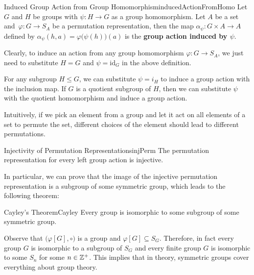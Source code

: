 \documentclass[math]{amznotes}
\theoremstyle{remark}
\newcommand{\0}{\mathbf{0}}
\newcommand{\1}{\mathbf{1}}
\begin{document}
\begin{dfnbox}{Induced Group Action from Group Homomorphism}{inducedActionFromHomo}
    Let $G$ and $H$ be groups with $\psi \colon H \to G$ as a group homomorphism. Let $A$ be a set and~$\varphi \colon G \to S_A$ be a permutation representation, then the map $\alpha_{\psi} \colon G \times A \to A$ defined by $\alpha_{\psi}\left(h, a\right) = \varphi\bigl(\psi\left(h\right)\bigr)\left(a\right)$ is the {\color{red} \textbf{group action induced by $\psi$}}.
\end{dfnbox}
Clearly, to induce an action from any group homomorphism $\varphi \colon G \to S_A$, we just need to substitute $H = G$ and $\psi = \mathrm{id}_G$ in the above definition.

For any subgroup $H \leq G$, we can substitute $\psi = i_H$ to induce a group action with the inclusion map. If $G$ is a quotient subgroup of $H$, then we can substitute $\psi$ with the quotient homomorphism and induce a group action.

Intuitively, if we pick an element from a group and let it act on all elements of a set to permute the set, different choices of the element should lead to different permutations.
\begin{probox}{Injectivity of Permutation Representations}{injPerm}
    The permutation representation for every left group action is injective.
\end{probox}
In particular, we can prove that the image of the injective permutation representation is a subgroup of some symmetric group, which leads to the following theorem:
\begin{thmbox}{Cayley's Theorem}{Cayley}
    Every group is isomorphic to some subgroup of some symmetric group.
\end{thmbox}
Observe that $\bigl(\varphi\left[G\right], \circ\bigr)$ is a group and $\varphi\left[G\right] \subseteq S_G$. Therefore, in fact every group $G$ is isomorphic to a subgroup of $S_G$ and every finite group $G$ is isomorphic to some $S_n$ for some $n \in \mathbb{Z}^+$. This implies that in theory, symmetric groups cover everything about group theory.
\end{document}
